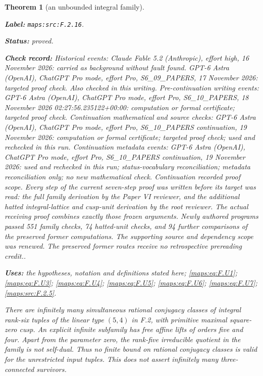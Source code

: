 \documentclass[11pt,a4paper]{article}
\newtheorem{theorem}{Theorem}[section]
\theoremstyle{definition}
\newcommand{\StatementRecord}[4]{\par\smallskip\begingroup\upshape\raggedright\noindent\textbf{Label:} \nolinkurl{#1}.\par\noindent\textbf{Status:} #2.\par\noindent\textbf{Check record:} #3.\par\noindent\textbf{Uses:} #4.\par\endgroup\smallskip}
\begin{document}
\begin{theorem}[an unbounded integral family]\label{maps:src:F.2.16}
\StatementRecord{maps:src:F.2.16}{proved}{Historical events: Claude Fable 5.2 (Anthropic), effort high, 16 November 2026: carried as background without fault found. GPT-6 Astra (OpenAI), ChatGPT Pro mode, effort Pro, S6\_09\_PAPERS, 17 November 2026: targeted proof check. Also checked in this writing. Pre-continuation writing events: GPT-6 Astra (OpenAI), ChatGPT Pro mode, effort Pro, S6\_10\_PAPERS, 18 November 2026 02:27:56.235122+00:00: computation or formal certificate; targeted proof check. Continuation mathematical and source checks: GPT-6 Astra (OpenAI), ChatGPT Pro mode, effort Pro, S6\_10\_PAPERS continuation, 19 November 2026: computation or formal certificate; targeted proof check; used and rechecked in this run. Continuation metadata events: GPT-6 Astra (OpenAI), ChatGPT Pro mode, effort Pro, S6\_10\_PAPERS continuation, 19 November 2026: used and rechecked in this run; status-vocabulary reconciliation; metadata reconciliation only; no new mathematical check. \emph{Continuation recorded proof scope.} Every step of the current seven-step proof was written before its target was read: the full family derivation by the Paper VI reviewer, and the additional hatted integral-lattice and cusp-unit derivation by the root reviewer. The actual receiving proof combines exactly those frozen arguments. Newly authored programs passed 551 family checks, 74 hatted-unit checks, and 94 further comparisons of the preserved former computations. The supporting source and dependency scope was renewed. The preserved former routes receive no retrospective prereading credit.}{the hypotheses, notation and definitions stated here; \cref{maps:eq:F.U1}; \cref{maps:eq:F.U3}; \cref{maps:eq:F.U4}; \cref{maps:eq:F.U5}; \cref{maps:eq:F.U6}; \cref{maps:eq:F.U7}; \cref{maps:src:F.2.5}}


There are infinitely many simultaneous rational conjugacy classes
of integral rank-six tuples of the linear type $(5,4)$ in F.2,
with primitive maximal square-zero cusp.  An explicit infinite
subfamily has free affine lifts of orders five and four.
Apart from the parameter zero, the rank-five irreducible quotient
in the family is not self-dual.  Thus no finite bound on rational
conjugacy classes is valid for the unrestricted input tuples.
This does not assert infinitely many three-connected survivors.

\end{theorem}
\end{document}
